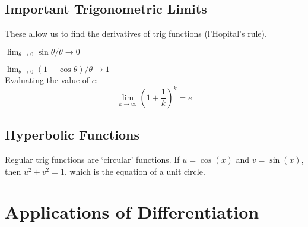 \subsection*{Important Trigonometric Limits}
These allow us to find the derivatives of trig functions (l'Hopital's rule).

$\lim_{\theta \rightarrow 0} \sin \theta / \theta \rightarrow 0$ 

$\lim_{\theta \rightarrow 0} (1 - \cos \theta) / \theta \rightarrow 1$ \\

Evaluating the value of $e$:
\begin{equation*}
  \lim_{k \rightarrow \infty} \left(1 + \frac{1}{k}\right)^k = e
\end{equation*}

\subsection*{Hyperbolic Functions}
Regular trig functions are `circular' functions. If $u = \cos(x)$ and $v = \sin(x)$, then $u^2 + v^2 = 1$, which is the equation of a unit circle.

\section{Applications of Differentiation}